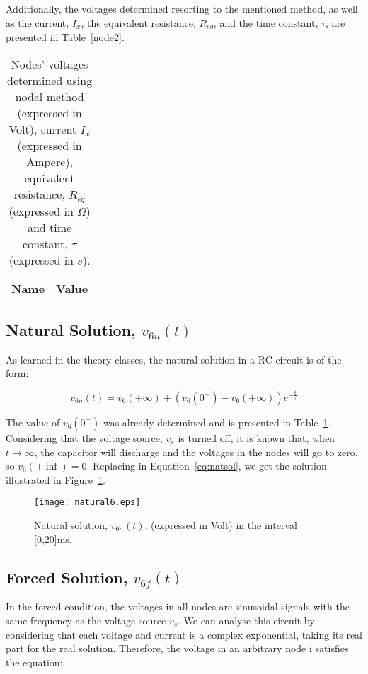 Additionally, the voltages determined resorting to the mentioned method, as well as the current, $I_x$, the equivalent resistance, $R_{eq}$, and the time constant, $\tau$, are presented in Table~\ref{node2}.

\begin{table}[H]
  \centering
  \begin{tabular}{|l|r|}
    \hline    
    {\bf Name} & {\bf Value} \\ \hline
    
  \end{tabular}
  \caption{Nodes' voltages determined using nodal method (expressed in Volt), current $I_x$ (expressed in Ampere), equivalent resistance, $R_{eq}$ (expressed in $\Omega$) and time constant, $\tau$ (expressed in $s$).}
  \label{tab:node2}
\end{table}


\subsection{Natural Solution, $v_{6n}(t)$}

As learned in the theory classes, the natural solution in a RC circuit is of the form:

\begin{equation}
  v_{6n}(t) = v_6(+\infty)+(v_6(0^+)-v_6(+\infty))e^{-\frac{t}{\tau}}
  \label{eq:natsol}
\end{equation}

The value of $v_6(0^+)$ was already determined and is presented in Table~\ref{tab:node2}. Considering that the voltage source, $v_s$ is turned off, it is known that, when $t \rightarrow \infty$, the capacitor will discharge and the voltages in the nodes will go to zero, so $v_6(+\inf)=0$. Replacing in Equation~\ref{eq:natsol}, we get the solution illustrated in Figure~\ref{fig:natsol}.

\begin{figure}[H] \centering
\texttt{[image: natural6.eps]}
\caption{Natural solution, $v_{6n}(t)$, (expressed in Volt) in the interval [0,20]ms.}
\label{fig:natsol}
\end{figure}


\subsection{Forced Solution, $v_{6f}(t)$} \label{subsec:forsol}

In the forced condition, the voltages in all nodes are sinusoidal signals with the same frequency as the voltage source $v_s$. We can analyse this circuit by considering that each voltage and current is a complex exponential, taking its real part for the real solution. Therefore, the voltage in an arbitrary node i satisfies the equation:

